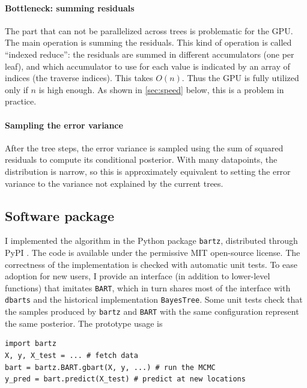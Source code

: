 \documentclass{article}
\begin{document}
    \paragraph{Bottleneck: summing residuals}

    The part that can not be parallelized across trees is problematic for the GPU. The main operation is summing the residuals. This kind of operation is called ``indexed reduce'': the residuals are summed in different accumulators (one per leaf), and which accumulator to use for each value is indicated by an array of indices (the traverse indices). This takes $O(n)$. Thus the GPU is fully utilized only if $n$ is high enough. As shown in \autoref{sec:speed} below, this is a problem in practice.

    \paragraph{Sampling the error variance}

    After the tree steps, the error variance is sampled using the sum of squared residuals to compute its conditional posterior. With many datapoints, the distribution is narrow, so this is approximately equivalent to setting the error variance to the variance not explained by the current trees.

    \subsection{Software package}

    I implemented the algorithm in the Python package \texttt{bartz}, distributed through PyPI \autocite{petrillo2024b}. The code is available under the permissive MIT open-source license. The correctness of the implementation is checked with automatic unit tests. To ease adoption for new users, I provide an interface (in addition to lower-level functions) that imitates \texttt{BART}, which in turn shares most of the interface with \texttt{dbarts} and the historical implementation \texttt{BayesTree}. Some unit tests check that the samples produced by \texttt{bartz} and \texttt{BART} with the same configuration represent the same posterior. The prototype usage is
    \lstset{
        language=Python,
        basicstyle=\ttfamily\small,
        commentstyle=\itshape,
    }
\begin{lstlisting}
import bartz
X, y, X_test = ... # fetch data
bart = bartz.BART.gbart(X, y, ...) # run the MCMC
y_pred = bart.predict(X_test) # predict at new locations
\end{lstlisting}
\end{document}
